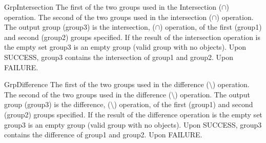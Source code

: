 \begin{prototype}{GrpIntersection}
		{\pInput}{The first of the two groups used in the Intersection ($\cap$)  operation.}
		{\pInput}{The second of the two groups used in the intersection ($\cap$) operation.}
		{\pOutput}{The output group (group3) is the intersection, ($\cap$) operation, of the first (group1) and second (group2) groups specified. If the result of the intersection operation is the empty set group3 is an empty group (valid group with no objects).}
	 	{Upon SUCCESS, group3 contains the intersection of group1 and group2.}
	 	{Upon FAILURE.}
\end{prototype}

\begin{prototype}{GrpDifference}
		{\pInput}{The first of the two groups used in the difference ($\setminus$)  operation.}
		{\pInput}{The second of the two groups used in the difference ($\setminus$) operation.}
		{\pOutput}{The output group (group3) is the difference, ($\setminus$) operation, of the first (group1) and second (group2) groups specified. If the result of the difference operation is the empty set group3 is an empty group (valid group with no objects).}
	 	{Upon SUCCESS,  group3 contains the difference of group1 and group2.}
	 	{Upon FAILURE.}
\end{prototype}

